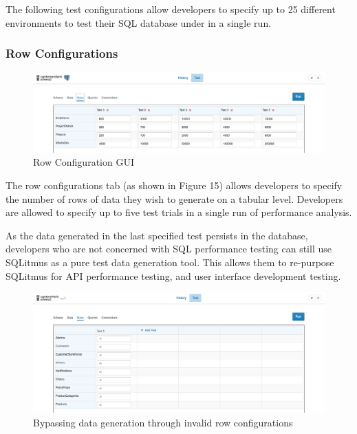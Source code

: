 \documentclass[12pt]{article}
\begin{document}
\begin{spacing}{1.9}
	
	The following test configurations allow developers to specify up to 25 different environments to test their SQL database under in a single run.
	
	\subsubsection{Row Configurations}
	
	\begin{figure}[H]
		\centering
		\includegraphics[width=\textwidth]{3-4-1.png}
		\caption{Row Configuration GUI }
		
	\end{figure}
	
	The row configurations tab (as shown in Figure 15) allows developers to specify the number of rows of data they wish to generate on a tabular level. Developers are allowed to specify up to five test trials in a single run of performance analysis.
	
	As the data generated in the last specified test persists in the database, developers who are not concerned with SQL performance testing can still use SQLitmus as a pure test data generation tool. This allows them to re-purpose SQLitmus for API performance testing, and user interface development testing.
	
	\begin{figure}[H]
		\centering
		\includegraphics[width=\textwidth]{3-4-1b.png}
		\caption{Bypassing data generation through invalid row configurations }
		
	\end{figure}
	

\end{spacing}
\end{document}
